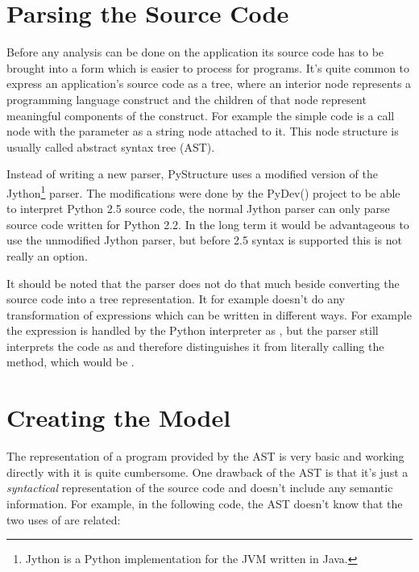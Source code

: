 \documentclass[12pt,halfparskip]{scrreprt}
\begin{document}
\section{Parsing the Source Code}

Before any analysis can be done on the application its source code has to be brought into a form which is easier to process for programs. It's quite common to express an application's source code as a tree, where an interior node represents a programming language construct and the children of that node represent meaningful components of the construct. For example the simple code  is a call node with the parameter as a string node attached to it. This node structure is usually called abstract syntax tree (AST).

Instead of writing a new parser, PyStructure uses a modified version of the Jython\footnote{Jython is a Python implementation for the JVM written in Java.} parser. The modifications were done by the PyDev() project to be able to interpret Python 2.5 source code, the normal Jython parser can only parse source code written for Python 2.2. In the long term it would be advantageous to use the unmodified Jython parser, but before 2.5 syntax is supported this is not really an option.


It should be noted that the parser does not do that much beside converting the source code into a tree representation. It for example doesn't do any transformation of expressions which can be written in different ways. For example the expression  is handled by the Python interpreter as , but the parser still interprets the code as  and therefore distinguishes it from literally calling the  method, which would be . 

\section{Creating the Model}



The representation of a program provided by the AST is very basic and working directly with it is quite cumbersome. 
One drawback of the AST is that it's just a \emph{syntactical} representation of the source code and doesn't include any semantic information. For example, in the following code, the AST doesn't know that the two uses of  are related:
\end{document}
